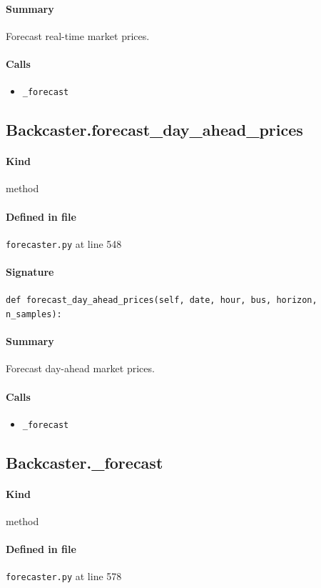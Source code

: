 \documentclass[11pt]{report}
\begin{document}
\paragraph{Summary} Forecast real-time market prices.
\paragraph{Calls}
\begin{itemize}[leftmargin=*]
  \item \texttt{\_forecast}
\end{itemize}
\subsection{Backcaster.forecast\_day\_ahead\_prices}
\label{def:forecaster.py:Backcaster.forecast_day_ahead_prices:L548}
\paragraph{Kind} method
\paragraph{Defined in file} \texttt{forecaster.py} at line 548
\paragraph{Signature} \texttt{def forecast\_day\_ahead\_prices(self, date, hour, bus, horizon, n\_samples):}
\paragraph{Summary} Forecast day-ahead market prices.
\paragraph{Calls}
\begin{itemize}[leftmargin=*]
  \item \texttt{\_forecast}
\end{itemize}
\subsection{Backcaster.\_forecast}
\label{def:forecaster.py:Backcaster._forecast:L578}
\paragraph{Kind} method
\paragraph{Defined in file} \texttt{forecaster.py} at line 578
\end{document}
